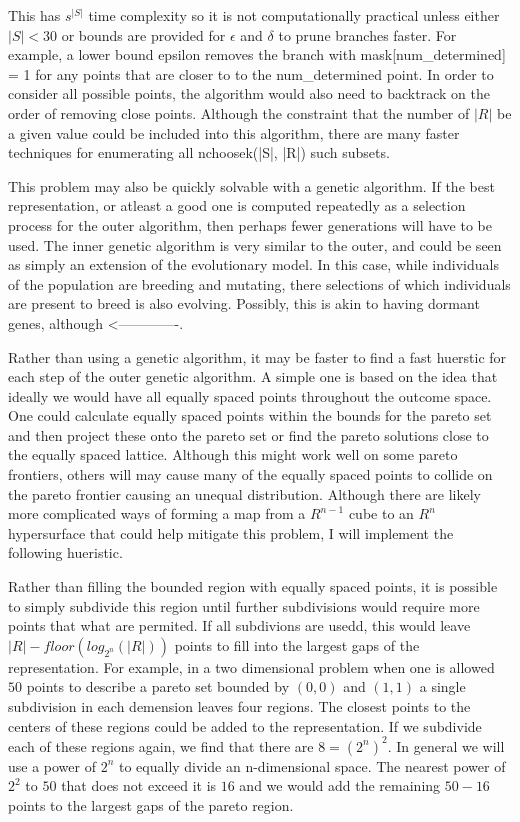 {{This has $s^{|S|}$ time complexity so it is not computationally practical unless either $|S| < 30$ or bounds are provided for $\epsilon$ and $\delta$ to prune branches faster.
For example, a lower bound epsilon removes the branch with mask[num_determined] = 1 for any points that are closer to to the num_determined point.
In order to consider all possible points, the algorithm would also need to backtrack on the order of removing close points.
Although the constraint that the number of $|R|$ be a given value could be included into this algorithm, there are many faster techniques for enumerating all nchoosek(|S|, |R|) such subsets.

This problem may also be quickly solvable with a genetic algorithm.
If the best representation, or atleast a good one is computed repeatedly as a selection process for the outer algorithm, then perhaps fewer generations will have to be used.
The inner genetic algorithm is very similar to the outer, and could be seen as simply an extension of the evolutionary model.
In this case, while individuals of the population are breeding and mutating, there selections of which individuals are present to breed is also evolving.
Possibly, this is akin to having dormant genes, although <-------------.

Rather than using a genetic algorithm, it may be faster to find a fast huerstic for each step of the outer genetic algorithm.
A simple one is based on the idea that ideally we would have all equally spaced points throughout the outcome space.
One could calculate equally spaced points within the bounds for the pareto set and then project these onto the pareto set or find the pareto solutions close to the equally spaced lattice.
Although this might work well on some pareto frontiers, others will may cause many of the equally spaced points to collide on the pareto frontier causing an unequal distribution.
Although there are likely more complicated ways of forming a map from a $R^{n-1}$ cube to an $R^n$ hypersurface that could help mitigate this problem, I will implement the following hueristic.

Rather than filling the bounded region with equally spaced points, it is possible to simply subdivide this region until further subdivisions would require more points that what are permited.
If all subdivions are usedd, this would leave $|R| - floor(log_{2^n}(|R|))$ points to fill into the largest gaps of the representation.
For example, in a two dimensional problem when one is allowed $50$ points to describe a pareto set bounded by $(0,0)$ and $(1,1)$ a single subdivision in each demension leaves four regions.
The closest points to the centers of these regions could be added to the representation.
If we subdivide each of these regions again, we find that there are $8 = (2^n)^2$.
In general we will use a power of $2^n$ to equally divide an n-dimensional space.
The nearest power of $2^2$ to $50$ that does not exceed it is $16$ and we would add the remaining $50 - 16$ points to the largest gaps of the pareto region.

}}
